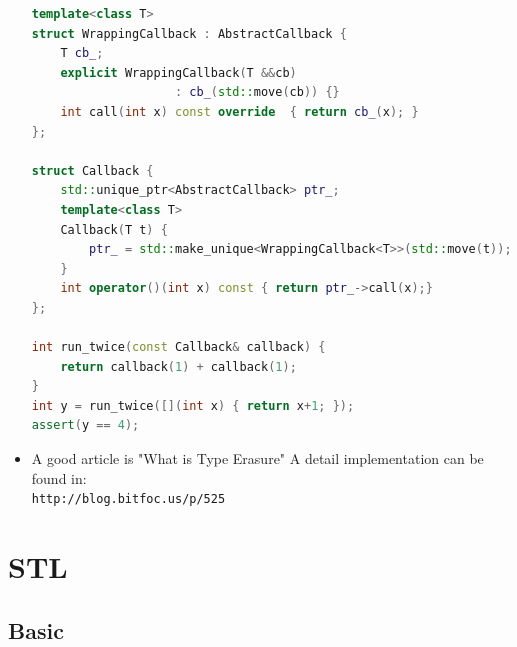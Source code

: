 \documentclass[a4paper,11pt,twoside]{book}
\begin{document}
\begin{itemize}
\begin{lstlisting}[frame=single, language=c++]
template<class T>
struct WrappingCallback : AbstractCallback {
	T cb_;
	explicit WrappingCallback(T &&cb) 
	                : cb_(std::move(cb)) {}	                
	int call(int x) const override  { return cb_(x); }
};

struct Callback {
	std::unique_ptr<AbstractCallback> ptr_;
	template<class T>
	Callback(T t) {
		ptr_ = std::make_unique<WrappingCallback<T>>(std::move(t));
	}
	int operator()(int x) const { return ptr_->call(x);}
};

int run_twice(const Callback& callback) {
	return callback(1) + callback(1);
}
int y = run_twice([](int x) { return x+1; });
assert(y == 4);
\end{lstlisting}

\item A good article is "What is Type Erasure" A detail implementation can be found in:\\ \verb|http://blog.bitfoc.us/p/525|
\end{itemize}

\chapter{STL}
\section{Basic}
\end{document}
